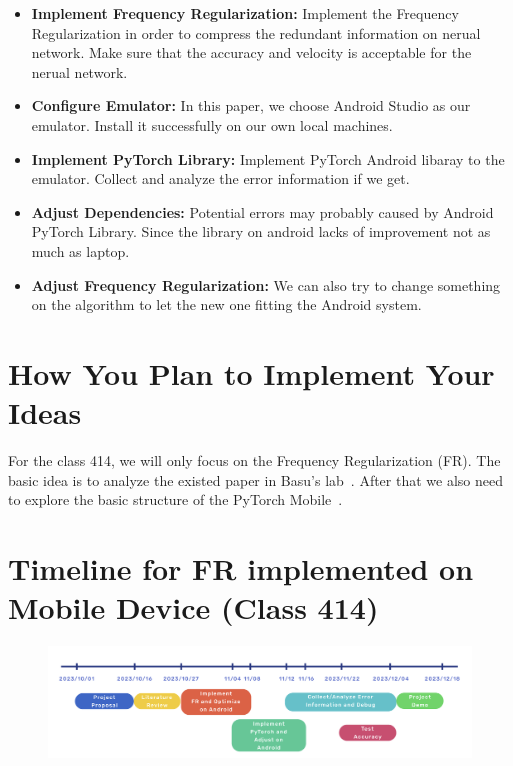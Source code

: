 \documentclass{article}
\begin{document}
\begin{itemize}
	\item \textbf{Implement Frequency Regularization:} Implement the Frequency Regularization in order to compress the redundant information on nerual network. Make sure that the accuracy and velocity is acceptable for the nerual network.
	
	\item \textbf{Configure Emulator:} In this paper, we choose Android Studio as our emulator. Install it successfully on our own local machines.
	
	\item \textbf{Implement PyTorch Library:} Implement PyTorch Android libaray to the emulator. Collect and analyze the error information if we get.
	
	\item \textbf{Adjust Dependencies:} Potential errors may probably caused by Android PyTorch Library. Since the library on android lacks of improvement not as much as laptop.
	
	\item \textbf{Adjust Frequency Regularization:} We can also try to change something on the algorithm to let the new one fitting the Android system.
	
\end{itemize}

\section*{How You Plan to Implement Your Ideas}

For the class 414, we will only focus on the Frequency Regularization (FR). The basic idea is to analyze the existed paper in Basu's lab~\cite{zhao2023frequency}. After that we also need to explore the basic structure of the PyTorch Mobile~\cite{pytorch_mobile}.



\section*{Timeline for FR implemented on Mobile Device (Class 414)}
\begin{figure}[!h]
\centering
\includegraphics[width=1\textwidth]{./figure/timeline.png}
 \label{timeline_fig}
\end{figure}
\end{document}
